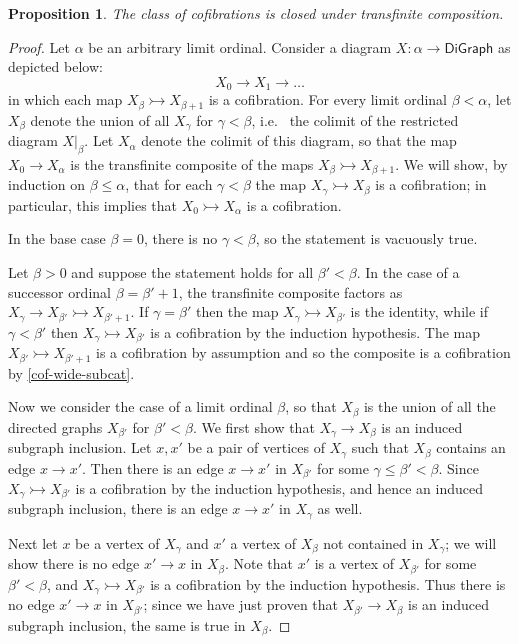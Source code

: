 \documentclass[11pt]{article}
\newtheorem{proposition}[theo]{Proposition}
\theoremstyle{definition}
\numberwithin{equation}{section}
\newcommand{\DiGraph}{\mathsf{DiGraph}}
\newcommand{\cto}{\rightarrowtail}
\begin{document}
\begin{proposition}\label{closed-under-transf-comp}
The class of cofibrations is closed under transfinite composition.
\end{proposition}

\begin{proof}
Let $\alpha$ be an arbitrary limit ordinal. Consider a diagram $X \colon \alpha \to \DiGraph$ as depicted below:
\[
X_0 \to X_1 \to \ldots
\]
in which each map $X_\beta \cto X_{\beta+1}$
is a cofibration. For every limit ordinal $\beta < \alpha$, let $X_\beta$ denote the union of all $X_\gamma$ for $\gamma < \beta$, i.e.~ the colimit of the restricted diagram $X|_{\beta}$. Let $X_\alpha$ denote the colimit of this diagram, so that the map $X_0 \to X_\alpha$ is the transfinite composite of the maps $X_{\beta} \cto X_{\beta + 1}$. We will show, by induction on $\beta \leq \alpha$, that for each $\gamma < \beta$ the map $X_\gamma  \cto X_\beta$ is a cofibration; in particular, this implies that $X_0 \cto X_\alpha$ is a cofibration.

In the base case $\beta = 0$, there is no $\gamma < \beta$, so the statement is vacuously true.

Let $\beta > 0$ and suppose the statement holds for all $\beta' < \beta$. In the case of a successor ordinal $\beta = \beta' + 1$, the transfinite composite factors as $X_\gamma \to X_{\beta'} \cto X_{\beta' + 1}$.
If $\gamma = \beta'$ then the map $X_\gamma \cto X_{\beta'}$ is the identity, while if $\gamma < \beta'$ then $X_\gamma \cto X_{\beta'}$ is a cofibration by the induction hypothesis. The map $X_{\beta'} \cto X_{\beta' + 1}$ is a cofibration by assumption and so the composite is a cofibration by \cref{cof-wide-subcat}.

Now we consider the case of a limit ordinal $\beta$, so that $X_\beta$ is the union of all the directed graphs $X_{\beta'}$ for $\beta' < \beta$. We first show that $X_\gamma \to X_\beta$ is an induced subgraph inclusion. Let $x, x'$ be a pair of vertices of $X_\gamma$ such that $X_\beta$ contains an edge $x \to x'$. Then there is an edge $x \to x'$ in $X_{\beta'}$ for some $\gamma \leq \beta' < \beta$. Since $X_\gamma \cto X_{\beta'}$ is a cofibration by the induction hypothesis, and hence an induced subgraph inclusion, there is an edge $x \to x'$ in $X_\gamma$ as well.

Next let $x$ be a vertex of $X_\gamma$ and $x'$ a vertex of $X_\beta$ not contained in $X_\gamma$; we will show there is no edge $x' \to x$ in $X_\beta$. Note that $x'$ is a vertex of $X_{\beta'}$ for some $\beta' < \beta$, and $X_\gamma \cto X_{\beta'}$ is a cofibration by the induction hypothesis. Thus there is no edge $x' \to x$ in $X_{\beta'}$; since we have just proven that $X_{\beta'} \to X_\beta$ is an induced subgraph inclusion, the same is true in $X_\beta$.


\end{proof}
\end{document}
